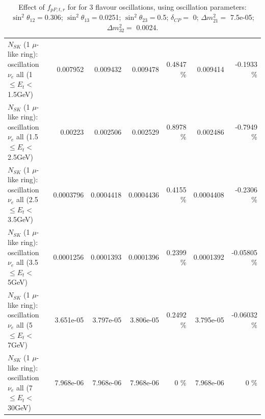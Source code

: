 \begin{table}
\begin{tabular}{| l | r | r | r  r | r  r |}
$N_{SK}$ (1 $\mu$-like ring): oscillation $\nu_{e}$ all (1 $\leq E_{t} <$ 1.5GeV) &        0.007952 &        0.009432 &        0.009478 &   0.4847 \%  &        0.009414 &  -0.1933 \%  \\ 
$N_{SK}$ (1 $\mu$-like ring): oscillation $\nu_{e}$ all (1.5 $\leq E_{t} <$ 2.5GeV) &         0.00223 &        0.002506 &        0.002529 &   0.8978 \%  &        0.002486 &  -0.7949 \%  \\ 
$N_{SK}$ (1 $\mu$-like ring): oscillation $\nu_{e}$ all (2.5 $\leq E_{t} <$ 3.5GeV) &       0.0003796 &       0.0004418 &       0.0004436 &   0.4155 \%  &       0.0004408 &  -0.2306 \%  \\ 
$N_{SK}$ (1 $\mu$-like ring): oscillation $\nu_{e}$ all (3.5 $\leq E_{t} <$ 5GeV) &       0.0001256 &       0.0001393 &       0.0001396 &   0.2399 \%  &       0.0001392 & -0.05805 \%  \\ 
 $N_{SK}$ (1 $\mu$-like ring): oscillation $\nu_{e}$ all (5 $\leq E_{t} <$ 7GeV) &       3.651e-05 &       3.797e-05 &       3.806e-05 &   0.2492 \%  &       3.795e-05 & -0.06032 \%  \\ 
$N_{SK}$ (1 $\mu$-like ring): oscillation $\nu_{e}$ all (7 $\leq E_{t} <$ 30GeV) &       7.968e-06 &       7.968e-06 &       7.968e-06 &        0 \%  &       7.968e-06 &        0 \%  \\ 
\hline
\hline
\end{tabular}
\caption{ Effect of $f_{pF; t, r}$ for for 3 flavour oscillations, using oscillation parameters:  $\sin^2\theta_{12} = $0.306; $\sin^2\theta_{13} = $0.0251; $\sin^2\theta_{23} = $0.5; $\delta_{CP} = $        0; $\Delta m^2_{21} = $    7.5e-05; $\Delta m^2_{32} = $    0.0024. }
\label{tab:num_xsec_pf_1RmuT_3f_osc_t13:0.0251}
\end{table}
\clearpage
